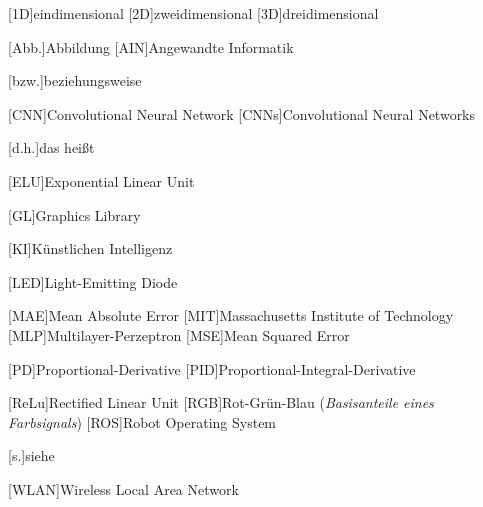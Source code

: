 
\begin{acronym}[ROS]
	[1D]{eindimensional}
	[2D]{zweidimensional}
	[3D]{dreidimensional}
	
	[Abb.]{Abbildung}
	[AIN]{Angewandte Informatik}
	
	[bzw.]{beziehungsweise}
	
	[CNN]{Convolutional Neural Network}
	[CNNs]{Convolutional Neural Networks}
	
	[d.h.]{das heißt}
	
	[ELU]{Exponential Linear Unit}
	
	[GL]{Graphics Library}
	
	[KI]{Künstlichen Intelligenz}
	
	[LED]{Light-Emitting Diode}
	
	[MAE]{Mean Absolute Error}
	[MIT]{Massachusetts Institute of Technology}
	[MLP]{Multilayer-Perzeptron}
	[MSE]{Mean Squared Error}
	
	[PD]{Proportional-Derivative}
	[PID]{Proportional-Integral-Derivative}
	
	[ReLu]{Rectified Linear Unit}
	[RGB]{Rot-Grün-Blau (\textit{Basisanteile eines Farbsignals})}
	[ROS]{Robot Operating System}
	
	[s.]{siehe}
	
	[WLAN]{Wireless Local Area Network}
\end{acronym}
